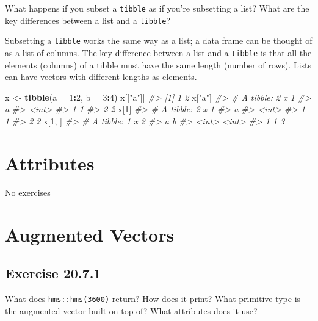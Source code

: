 \documentclass[]{book}
\newenvironment{Shaded}{\begin{snugshade}}{\end{snugshade}}
\newcommand{\CommentTok}[1]{\textcolor[rgb]{0.56,0.35,0.01}{\textit{#1}}}
\newcommand{\DataTypeTok}[1]{\textcolor[rgb]{0.13,0.29,0.53}{#1}}
\newcommand{\DecValTok}[1]{\textcolor[rgb]{0.00,0.00,0.81}{#1}}
\newcommand{\KeywordTok}[1]{\textcolor[rgb]{0.13,0.29,0.53}{\textbf{#1}}}
\newcommand{\NormalTok}[1]{#1}
\newcommand{\OperatorTok}[1]{\textcolor[rgb]{0.81,0.36,0.00}{\textbf{#1}}}
\newcommand{\StringTok}[1]{\textcolor[rgb]{0.31,0.60,0.02}{#1}}
\theoremstyle{plain}
\theoremstyle{remark}
\theoremstyle{definition}
\theoremstyle{definition}
\theoremstyle{definition}
\theoremstyle{remark}
\begin{document}
What happens if you subset a \texttt{tibble} as if you're subsetting a
list? What are the key differences between a list and a \texttt{tibble}?

Subsetting a \texttt{tibble} works the same way as a list; a data frame
can be thought of as a list of columns. The key difference between a
list and a \texttt{tibble} is that all the elements (columns) of a
tibble must have the same length (number of rows). Lists can have
vectors with different lengths as elements.

\begin{Shaded}
\begin{Highlighting}[]
\NormalTok{x <-}\StringTok{ }\KeywordTok{tibble}\NormalTok{(}\DataTypeTok{a =} \DecValTok{1}\OperatorTok{:}\DecValTok{2}\NormalTok{, }\DataTypeTok{b =} \DecValTok{3}\OperatorTok{:}\DecValTok{4}\NormalTok{)}
\NormalTok{x[[}\StringTok{"a"}\NormalTok{]]}
\CommentTok{#> [1] 1 2}
\NormalTok{x[}\StringTok{"a"}\NormalTok{]}
\CommentTok{#> # A tibble: 2 x 1}
\CommentTok{#>       a}
\CommentTok{#>   <int>}
\CommentTok{#> 1     1}
\CommentTok{#> 2     2}
\NormalTok{x[}\DecValTok{1}\NormalTok{]}
\CommentTok{#> # A tibble: 2 x 1}
\CommentTok{#>       a}
\CommentTok{#>   <int>}
\CommentTok{#> 1     1}
\CommentTok{#> 2     2}
\NormalTok{x[}\DecValTok{1}\NormalTok{, ]}
\CommentTok{#> # A tibble: 1 x 2}
\CommentTok{#>       a     b}
\CommentTok{#>   <int> <int>}
\CommentTok{#> 1     1     3}
\end{Highlighting}
\end{Shaded}

\hypertarget{attributes}{%
\section{Attributes}\label{attributes}}

No exercises

\hypertarget{augmented-vectors}{%
\section{Augmented Vectors}\label{augmented-vectors}}

\hypertarget{exercise-20.7.1}{%
\subsection*{\texorpdfstring{Exercise
{20.7.1}}{Exercise 20.7.1}}\label{exercise-20.7.1}}

What does \texttt{hms::hms(3600)} return? How does it print? What
primitive type is the augmented vector built on top of? What attributes
does it use?
\end{document}
